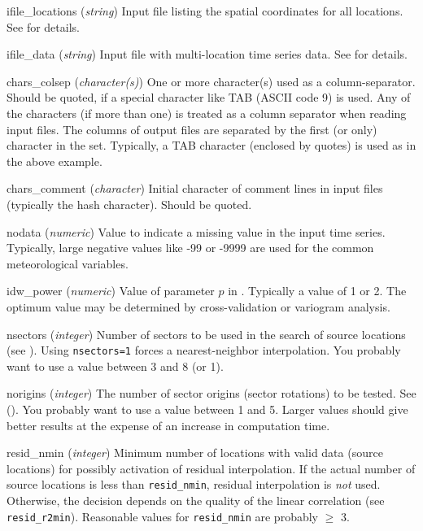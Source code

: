 \begin{columndef}
  \item[ifile\_locations] (\textit{string}) Input file listing the spatial coordinates for all locations. See  for details.
  \item[ifile\_data] (\textit{string}) Input file with multi-location time series data. See  for details.
  \item[chars\_colsep] (\textit{character(s)}) One or more character(s) used as a column-separator. Should be quoted, if a special character like TAB (ASCII code 9) is used. Any of the characters (if more than one) is treated as a column separator when reading input files. The columns of output files are separated by the first (or only) character in the set. Typically, a TAB character (enclosed by quotes) is used as in the above example.
  \item[chars\_comment] (\textit{character}) Initial character of comment lines in input files (typically the hash character). Should be quoted.
  \item[nodata] (\textit{numeric}) Value to indicate a missing value in the input time series. Typically, large negative values like -99 or -9999 are used for the common meteorological variables.
  \item[idw\_power] (\textit{numeric}) Value of parameter $p$ in . Typically a value of 1 or 2. The optimum value may be determined by cross-validation or variogram analysis.
  \item[nsectors] (\textit{integer}) Number of sectors to be used in the search of source locations (see ). Using \texttt{nsectors=1} forces a nearest-neighbor interpolation. You probably want to use a value between 3 and 8 (or 1).
  \item[norigins] (\textit{integer}) The number of sector origins (sector rotations) to be tested. See  (). You probably want to use a value between 1 and 5. Larger values should give better results at the expense of an increase in computation time.
  \item[resid\_nmin] (\textit{integer}) Minimum number of locations with valid data (source locations) for possibly activation of residual interpolation. If the actual number of source locations is less than \verb!resid_nmin!, residual interpolation is \emph{not} used. Otherwise, the decision depends on the quality of the linear correlation (see \verb!resid_r2min!). Reasonable values for \verb!resid_nmin! are probably $\ge$ 3.

\end{columndef}

